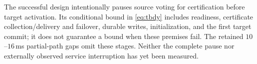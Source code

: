 The successful design intentionally pauses source voting for certification
before target activation. Its conditional bound in \eqref{eq:tbdy} includes
readiness, certificate collection/delivery and failover, durable writes,
initialization, and the first target commit; it does not guarantee a bound
when these premises fail. The retained $10$--$16$\,ms partial-path gaps omit
these stages. Neither the complete pause nor externally observed service
interruption has yet been measured.
